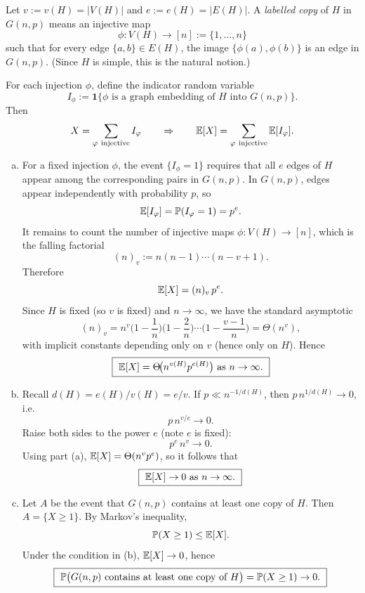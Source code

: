 \documentclass{article}
\begin{document}
\begin{tcolorbox}[colback=white, colframe=black!70, title=\textbf{Solution to Exercise 3}, breakable]
Let $v:=v(H)=|V(H)|$ and $e:=e(H)=|E(H)|$. A \emph{labelled copy} of $H$ in $G(n,p)$ means an injective map
\[
\phi:V(H)\to [n]:=\{1,\dots,n\}
\]
such that for every edge $\{a,b\}\in E(H)$, the image $\{\phi(a),\phi(b)\}$ is an edge in $G(n,p)$. (Since $H$ is simple, this is the natural notion.)

For each injection $\phi$, define the indicator random variable
\[
I_\phi := \mathbf 1\{\text{$\phi$ is a graph embedding of $H$ into $G(n,p)$}\}.
\]
Then
\[
X=\sum_{\phi\ \text{injective}} I_\phi
\qquad\Rightarrow\qquad
\E[X]=\sum_{\phi\ \text{injective}} \E[I_\phi].
\]

\begin{enumerate}[(a)]
\item For a fixed injection $\phi$, the event $\{I_\phi=1\}$ requires that all $e$ edges of $H$ appear among the corresponding pairs in $G(n,p)$. In $G(n,p)$, edges appear independently with probability $p$, so
\[
\E[I_\phi]=\P(I_\phi=1)=p^{e}.
\]
It remains to count the number of injective maps $\phi:V(H)\to[n]$, which is the falling factorial
\[
(n)_v := n(n-1)\cdots (n-v+1).
\]
Therefore
\[
\E[X]=(n)_v\, p^e.
\]
Since $H$ is fixed (so $v$ is fixed) and $n\to\infty$, we have the standard asymptotic
\[
(n)_v = n^v\Big(1-\frac{1}{n}\Big)\Big(1-\frac{2}{n}\Big)\cdots \Big(1-\frac{v-1}{n}\Big)=\Theta(n^v),
\]
with implicit constants depending only on $v$ (hence only on $H$). Hence
\[
\boxed{\ \E[X]=\Theta\!\big(n^{v(H)}p^{e(H)}\big)\ \text{as } n\to\infty.\ }
\]

\item Recall $d(H)=e(H)/v(H)=e/v$. If $p\ll n^{-1/d(H)}$, then $p\, n^{1/d(H)}\to 0$, i.e.
\[
p\, n^{v/e}\to 0.
\]
Raise both sides to the power $e$ (note $e$ is fixed):
\[
p^e\, n^v \to 0.
\]
Using part (a), $\E[X]=\Theta(n^v p^e)$, so it follows that
\[
\boxed{\ \E[X]\to 0\ \text{as } n\to\infty.\ }
\]

\item Let $A$ be the event that $G(n,p)$ contains at least one copy of $H$. Then $A=\{X\ge 1\}$. By Markov's inequality,
\[
\P(X\ge 1)\le \E[X].
\]
Under the condition in (b), $\E[X]\to 0$, hence
\[
\boxed{\ \P\big(G(n,p)\text{ contains at least one copy of }H\big)=\P(X\ge 1)\to 0.\ }
\]
\end{enumerate}
\end{tcolorbox}

\vspace{12pt}
\end{document}
